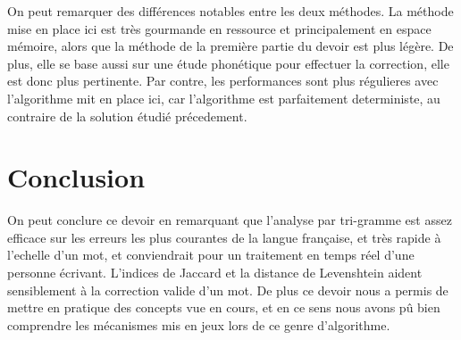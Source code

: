 \documentclass[french,12pt,a4]{report}
\begin{document}
On peut remarquer des différences notables entre les deux méthodes. La
méthode mise en place ici est très gourmande en ressource et
principalement en espace mémoire, alors que la méthode de la première
partie du devoir est plus légère. De plus, elle se base aussi sur une
étude phonétique pour effectuer la correction, elle est donc plus pertinente.
Par contre, les performances sont plus régulieres avec l'algorithme mit
en place ici, car l'algorithme est parfaitement deterministe, au
contraire de la solution étudié précedement.

\chapter{Conclusion}

On peut conclure ce devoir en remarquant que l'analyse par tri-gramme
est assez efficace sur les erreurs les plus courantes de la langue
française, et très rapide à l'echelle d'un mot, et conviendrait pour
un traitement en temps réel d'une personne écrivant. L'indices de Jaccard et la distance de
Levenshtein aident sensiblement à la correction valide d'un mot. De
plus ce devoir nous a permis de mettre en pratique des concepts vue en
cours, et en ce sens nous avons pû bien comprendre les mécanismes mis
en jeux lors de ce genre d'algorithme.
\end{document}
